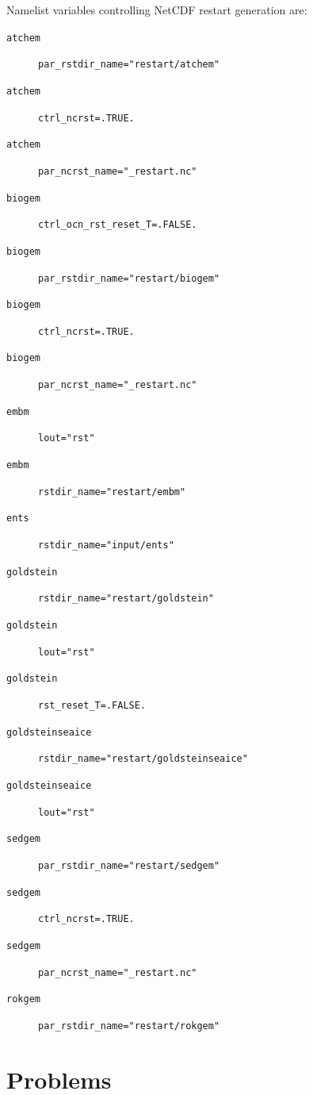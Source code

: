 \documentclass[a4paper,11pt,article]{memoir}
\begin{document}
Namelist variables controlling NetCDF restart generation are:
\begin{description}
  \item[\texttt{atchem}]{\texttt{par\_rstdir\_name="restart/atchem"}}
  \item[\texttt{atchem}]{\texttt{ctrl\_ncrst=.TRUE.}}
  \item[\texttt{atchem}]{\texttt{par\_ncrst\_name="\_restart.nc"}}

  \item[\texttt{biogem}]{\texttt{ctrl\_ocn\_rst\_reset\_T=.FALSE.}}
  \item[\texttt{biogem}]{\texttt{par\_rstdir\_name="restart/biogem"}}
  \item[\texttt{biogem}]{\texttt{ctrl\_ncrst=.TRUE.}}
  \item[\texttt{biogem}]{\texttt{par\_ncrst\_name="\_restart.nc"}}

  \item[\texttt{embm}]{\texttt{lout="rst"}}
  \item[\texttt{embm}]{\texttt{rstdir\_name="restart/embm"}}

  \item[\texttt{ents}]{\texttt{rstdir\_name="input/ents"}}

  \item[\texttt{goldstein}]{\texttt{rstdir\_name="restart/goldstein"}}
  \item[\texttt{goldstein}]{\texttt{lout="rst"}}
  \item[\texttt{goldstein}]{\texttt{rst\_reset\_T=.FALSE.}}

  \item[\texttt{goldsteinseaice}]{\texttt{rstdir\_name="restart/goldsteinseaice"}}
  \item[\texttt{goldsteinseaice}]{\texttt{lout="rst"}}

  \item[\texttt{sedgem}]{\texttt{par\_rstdir\_name="restart/sedgem"}}
  \item[\texttt{sedgem}]{\texttt{ctrl\_ncrst=.TRUE.}}
  \item[\texttt{sedgem}]{\texttt{par\_ncrst\_name="\_restart.nc"}}

  \item[\texttt{rokgem}]{\texttt{par\_rstdir\_name="restart/rokgem"}}
\end{description}

\newpage
\chapter{Problems}
\end{document}
